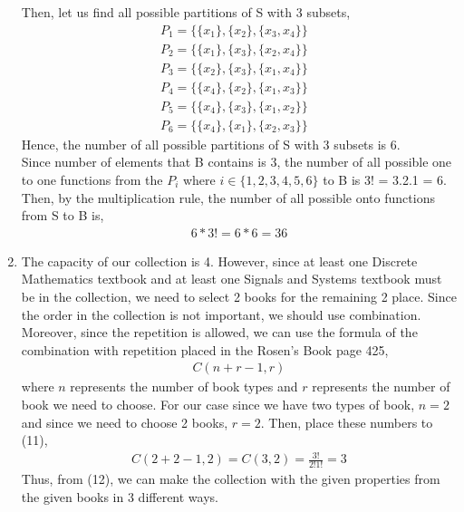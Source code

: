 \documentclass[12pt]{article}
\begin{document}
\begin{enumerate}
 Then, let us find all possible partitions of S with 3 subsets,
 \begin{equation*}
 \begin{split}
 P_{1} = \{\{x_{1}\},\{x_{2}\},\{x_{3},x_{4}\}\} & \\
 P_{2} = \{\{x_{1}\},\{x_{3}\},\{x_{2},x_{4}\}\}& \\
 P_{3} = \{\{x_{2}\},\{x_{3}\},\{x_{1},x_{4}\}\}& \\
 P_{4} = \{\{x_{4}\},\{x_{2}\},\{x_{1},x_{3}\}\}& \\
 P_{5} = \{\{x_{4}\},\{x_{3}\},\{x_{1},x_{2}\}\}& \\
 P_{6} = \{\{x_{4}\},\{x_{1}\},\{x_{2},x_{3}\}\}
 \end{split}
 \end{equation*}
 Hence, the number of all possible partitions of S with 3 subsets is 6.\\
 Since number of elements that B contains is 3, the number of all possible one to one functions from the $P_{i}$ where $i\in\{1,2,3,4,5,6\}$ to B is 3! = 3.2.1 = 6. Then, by the multiplication rule, the number of all possible onto functions from S to B is,
 \begin{equation*}
 \begin{split}
 6*3!  = 6*6 = 36
 \end{split}
 \end{equation*}



\item The capacity of our collection is 4. However, since at least one Discrete Mathematics textbook and at least one Signals and Systems textbook must
be in the collection, we need to select 2 books for the remaining 2 place. Since the order in the collection is not important, we should use combination. Moreover, since the repetition is allowed, we can use the formula of the combination with repetition placed in the Rosen's Book page 425, \\
\begin{equation}
\begin{split}
C(n+r-1,r) 
\end{split}
\end{equation}
where $n$ represents the number of book types and $r$ represents the number of book we need to choose. For our case since we have two types of book, $n = 2$ and since we need to choose 2 books, $r=2$. Then, place these numbers to (11),
\begin{equation}
\begin{split}
C(2+2-1,2) = C(3,2) = \frac{3!}{2!1!} = 3
\end{split}
\end{equation}
Thus, from (12), we can make the collection with the given properties from the given books in 3 different ways.
\end{enumerate}
\end{document}
